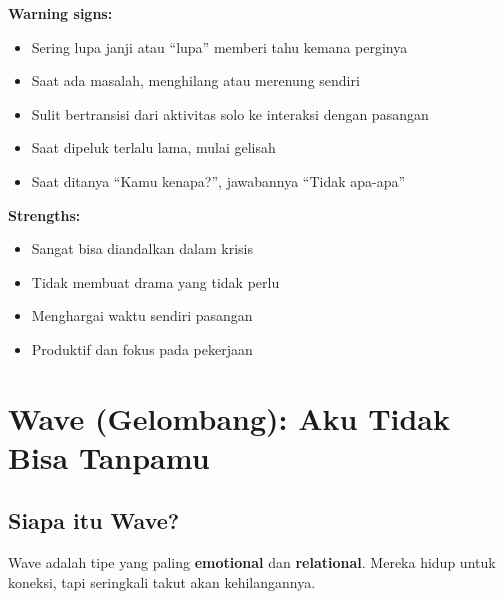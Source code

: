 \begin{tipbox}
\textbf{Warning signs:}
\begin{itemize}
    \item Sering lupa janji atau ``lupa'' memberi tahu kemana perginya
    \item Saat ada masalah, menghilang atau merenung sendiri
    \item Sulit bertransisi dari aktivitas solo ke interaksi dengan pasangan
    \item Saat dipeluk terlalu lama, mulai gelisah
    \item Saat ditanya ``Kamu kenapa?'', jawabannya ``Tidak apa-apa''
\end{itemize}

\textbf{Strengths:}
\begin{itemize}
    \item Sangat bisa diandalkan dalam krisis
    \item Tidak membuat drama yang tidak perlu
    \item Menghargai waktu sendiri pasangan
    \item Produktif dan fokus pada pekerjaan
\end{itemize}
\end{tipbox}

\section{Wave (Gelombang): Aku Tidak Bisa Tanpamu}

\subsection{Siapa itu Wave?}

Wave adalah tipe yang paling \textbf{emotional} dan \textbf{relational}. Mereka hidup untuk koneksi, tapi seringkali takut akan kehilangannya.

